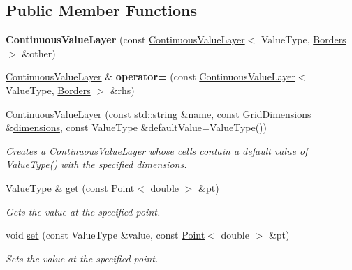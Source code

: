 \subsection*{Public Member Functions}
\begin{DoxyCompactItemize}
\item 
\hypertarget{classrepast_1_1_continuous_value_layer_a89bd9bd46e0bc1b10f1106a88298bdbd}{{\bfseries Continuous\-Value\-Layer} (const \hyperlink{classrepast_1_1_continuous_value_layer}{Continuous\-Value\-Layer}$<$ Value\-Type, \hyperlink{classrepast_1_1_borders}{Borders} $>$ \&other)}\label{classrepast_1_1_continuous_value_layer_a89bd9bd46e0bc1b10f1106a88298bdbd}

\item 
\hypertarget{classrepast_1_1_continuous_value_layer_ae302163efacfefd43908f9ca37574010}{\hyperlink{classrepast_1_1_continuous_value_layer}{Continuous\-Value\-Layer} \& {\bfseries operator=} (const \hyperlink{classrepast_1_1_continuous_value_layer}{Continuous\-Value\-Layer}$<$ Value\-Type, \hyperlink{classrepast_1_1_borders}{Borders} $>$ \&rhs)}\label{classrepast_1_1_continuous_value_layer_ae302163efacfefd43908f9ca37574010}

\item 
\hyperlink{classrepast_1_1_continuous_value_layer_ab5c3df3bdca7ef3b87150f9be3dfc2fe}{Continuous\-Value\-Layer} (const std\-::string \&\hyperlink{classrepast_1_1_base_value_layer_a27277765ee50f9d5446b253f77797f5c}{name}, const \hyperlink{classrepast_1_1_grid_dimensions}{Grid\-Dimensions} \&\hyperlink{classrepast_1_1_value_layer_a51fe7fe718305d0c006bc465a14ef0e3}{dimensions}, const Value\-Type \&default\-Value=Value\-Type())
\begin{DoxyCompactList}\small\item\em Creates a \hyperlink{classrepast_1_1_continuous_value_layer}{Continuous\-Value\-Layer} whose cells contain a default value of Value\-Type() with the specified dimensions. \end{DoxyCompactList}\item 
Value\-Type \& \hyperlink{classrepast_1_1_continuous_value_layer_a020830982b41af4f1d955eee5b617bfa}{get} (const \hyperlink{classrepast_1_1_point}{Point}$<$ double $>$ \&pt)
\begin{DoxyCompactList}\small\item\em Gets the value at the specified point. \end{DoxyCompactList}\item 
void \hyperlink{classrepast_1_1_continuous_value_layer_a619f04cc04200c8de6616ec971674289}{set} (const Value\-Type \&value, const \hyperlink{classrepast_1_1_point}{Point}$<$ double $>$ \&pt)
\begin{DoxyCompactList}\small\item\em Sets the value at the specified point. \end{DoxyCompactList}\end{DoxyCompactItemize}
